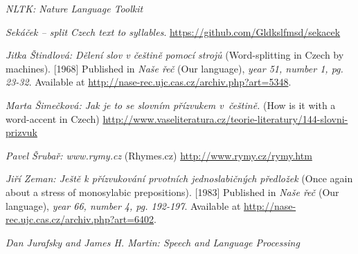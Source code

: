 \documentclass[a4]{article}
\begin{document}
\begin{thebibliography}{99}

 {\sl NLTK: Nature Language Toolkit}

 {\sl Sekáček -- split Czech text to syllables}.
 \url{https://github.com/Gldkslfmsd/sekacek}


 {\sl Jitka Štindlová: Dělení slov v češtině pomocí strojů}
(Word-splitting in Czech by machines). [1968] Published in {\sl Naše řeč}
(Our language),
{\sl year 51, number 1, pg. 23-32}. Available at
\url{http://nase-rec.ujc.cas.cz/archiv.php?art=5348}.


 {\sl Marta Šimečková: Jak je to se slovním přízvukem v~češtině.} (How is
 it with a word-accent in Czech)
 \url{http://www.vaseliteratura.cz/teorie-literatury/144-slovni-prizvuk}


 {\sl Pavel Šrubař: www.rymy.cz} (Rhymes.cz)
 \url{http://www.rymy.cz/rymy.htm}




 {\sl Jiří Zeman: Ještě k přízvukování prvotních jednoslabičných
 předložek}
(Once again about a stress of monosylabic prepositions). [1983] Published in {\sl Naše řeč}
(Our language),
{\sl year 66, number 4, pg. 192-197}. Available at
\url{http://nase-rec.ujc.cas.cz/archiv.php?art=6402}.



 {\sl  Dan Jurafsky and James H. Martin:	
 Speech and Language Processing
 }




\end{thebibliography}



\end{document}
